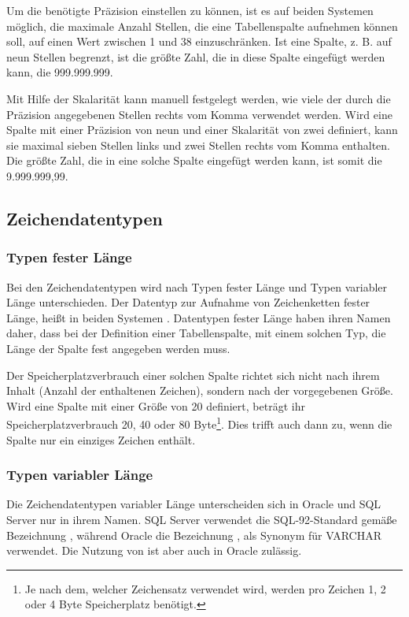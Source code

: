           Um die benötigte Präzision einstellen zu können, ist es auf beiden Systemen möglich, die maximale Anzahl Stellen, die eine Tabellenspalte aufnehmen können soll, auf einen Wert zwischen 1 und 38 einzuschränken. Ist eine Spalte, z. B. auf neun Stellen begrenzt, ist die größte Zahl, die in diese Spalte eingefügt werden kann, die 999.999.999.

          Mit Hilfe der Skalarität kann manuell festgelegt werden, wie viele der durch die Präzision angegebenen Stellen rechts vom Komma verwendet werden. Wird eine Spalte mit einer Präzision von neun und einer Skalarität von zwei definiert, kann sie maximal sieben Stellen links und zwei Stellen rechts vom Komma enthalten. Die größte Zahl, die in eine solche Spalte eingefügt werden kann, ist somit die 9.999.999,99.
      \subsection{Zeichendatentypen}
        \subsubsection{Typen fester Länge}
          Bei den Zeichendatentypen wird nach Typen fester Länge und Typen variabler Länge unterschieden. Der Datentyp zur Aufnahme von Zeichenketten fester Länge, heißt in beiden Systemen . Datentypen fester Länge haben ihren Namen daher, dass bei der Definition einer Tabellenspalte, mit einem solchen Typ, die Länge der Spalte fest angegeben werden muss.

          \begin{merke}
            Der Speicherplatzverbrauch einer solchen Spalte richtet sich nicht nach ihrem Inhalt (Anzahl der enthaltenen Zeichen), sondern nach der vorgegebenen Größe. Wird eine Spalte mit einer Größe von 20 definiert, beträgt ihr Speicherplatzverbrauch 20, 40 oder 80 Byte\footnote{Je nach dem, welcher Zeichensatz verwendet wird, werden pro Zeichen 1, 2 oder 4 Byte Speicherplatz benötigt.}. Dies trifft auch dann zu, wenn die Spalte nur ein einziges Zeichen enthält.
          \end{merke}
        \subsubsection{Typen variabler Länge}
          Die Zeichendatentypen variabler Länge unterscheiden sich in Oracle und SQL Server nur in ihrem Namen. SQL Server verwendet die SQL-92-Standard gemäße Bezeichnung , während Oracle die Bezeichnung , als Synonym für VARCHAR verwendet. Die Nutzung von  ist aber auch in Oracle zulässig.

